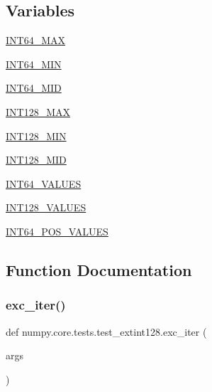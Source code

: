 \subsection*{Variables}
\begin{DoxyCompactItemize}
\item 
\hyperlink{namespacenumpy_1_1core_1_1tests_1_1test__extint128_ae3b6a8a328331723ef92141617130de8}{I\+N\+T64\+\_\+\+M\+AX}
\item 
\hyperlink{namespacenumpy_1_1core_1_1tests_1_1test__extint128_a64d43107bad709a61a62992dded82c22}{I\+N\+T64\+\_\+\+M\+IN}
\item 
\hyperlink{namespacenumpy_1_1core_1_1tests_1_1test__extint128_a2ae1943d5fa2426f930455afef027415}{I\+N\+T64\+\_\+\+M\+ID}
\item 
\hyperlink{namespacenumpy_1_1core_1_1tests_1_1test__extint128_a05c8d5d85bcec5460616614dc5db0bbb}{I\+N\+T128\+\_\+\+M\+AX}
\item 
\hyperlink{namespacenumpy_1_1core_1_1tests_1_1test__extint128_a58cfc771617fb2268703654ce489178b}{I\+N\+T128\+\_\+\+M\+IN}
\item 
\hyperlink{namespacenumpy_1_1core_1_1tests_1_1test__extint128_aaffc5f0717703331b0e2ad206028bc97}{I\+N\+T128\+\_\+\+M\+ID}
\item 
\hyperlink{namespacenumpy_1_1core_1_1tests_1_1test__extint128_a90edf145474aca78206f30d75e9fbdc9}{I\+N\+T64\+\_\+\+V\+A\+L\+U\+ES}
\item 
\hyperlink{namespacenumpy_1_1core_1_1tests_1_1test__extint128_a0a547d2531b17cd98bfed46cd52a635f}{I\+N\+T128\+\_\+\+V\+A\+L\+U\+ES}
\item 
\hyperlink{namespacenumpy_1_1core_1_1tests_1_1test__extint128_a78a3f3bad5976c28d7c14470e579174c}{I\+N\+T64\+\_\+\+P\+O\+S\+\_\+\+V\+A\+L\+U\+ES}
\end{DoxyCompactItemize}


\subsection{Function Documentation}
\mbox{\label{namespacenumpy_1_1core_1_1tests_1_1test__extint128_a96f304bcd73d8e14f30c0d83fd9569fa}} 
\subsubsection{\texorpdfstring{exc\+\_\+iter()}{exc\_iter()}}
{\footnotesize\ttfamily def numpy.\+core.\+tests.\+test\+\_\+extint128.\+exc\+\_\+iter (\begin{DoxyParamCaption}\item[{}]{args }\end{DoxyParamCaption})}

